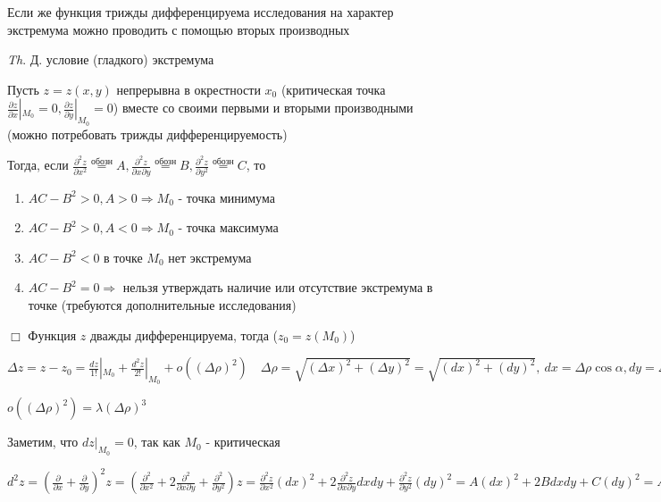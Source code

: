 \documentclass[12pt]{article}
\begin{document}
    Если же функция трижды дифференцируема исследования на характер экстремума можно проводить с помощью вторых производных

    \vspace{3mm}
\textit{Th}. Д. условие (гладкого) экстремума

    Пусть $z = z(x, y)$ непрерывна в окрестности $x_0$ (критическая точка $\displaystyle \frac{\partial z}{\partial x} |_{M_0} = 0, \frac{\partial z}{\partial y} |_{M_0} = 0$)
    вместе со своими первыми и вторыми производными (можно потребовать трижды дифференцируемость)

    Тогда, если $\displaystyle \frac{\partial^2 z}{\partial x^2} \stackrel{\text{обозн}}{=} A, \frac{\partial^2 z}{\partial x \partial y} \stackrel{\text{обозн}}{=} B, \frac{\partial^2 z}{\partial y^2} \stackrel{\text{обозн}}{=} C$, то

    \begin{enumerate}
        \item $AC - B^2 > 0, A > 0 \Longrightarrow M_0$ - точка минимума
        \item $AC - B^2 > 0, A < 0 \Longrightarrow M_0$ - точка максимума
        \item $AC - B^2 < 0$ в точке $M_0$ нет экстремума
        \item $AC - B^2 = 0\Longrightarrow$ нельзя утверждать наличие или отсутствие экстремума в точке (требуются дополнительные исследования)
    \end{enumerate}

    $\Box$ Функция $z$ дважды дифференцируема, тогда ($z_0 = z(M_0)$)

    $\displaystyle \Delta z = z - z_0 = \frac{dz}{1!} |_{M_0} + \frac{d^2 z}{2!} |_{M_0} + o((\Delta \rho)^2) \quad \Delta \rho = \sqrt{(\Delta x)^2 + (\Delta y)^2} = \sqrt{(dx)^2 + (dy)^2}, \ dx = \Delta\rho \cos\alpha, dy = \Delta\rho \sin\alpha$

    $o((\Delta \rho)^2) = \lambda (\Delta \rho)^3$

    Заметим, что $dz |_{M_0} = 0$, так как $M_0$ - критическая

    $\displaystyle d^2 z = (\frac{\partial}{\partial x} + \frac{\partial}{\partial y})^2 z = (\frac{\partial^2}{\partial x^2} + 2 \frac{\partial^2}{\partial x \partial y} + \frac{\partial^2}{\partial y^2}) z =
    \frac{\partial^2 z}{\partial x^2} (dx)^2 + 2 \frac{\partial^2 z}{\partial x \partial y} dxdy + \frac{\partial^2 z}{\partial y^2} (dy)^2 = A (dx)^2 + 2B dxdy + C(dy)^2 =
    A(\Delta \rho)^2 \cos^2\alpha + 2B (\Delta \rho)^2 \cos\alpha\sin\alpha + C(\Delta \rho)^2 \sin^2\alpha$
\end{document}
